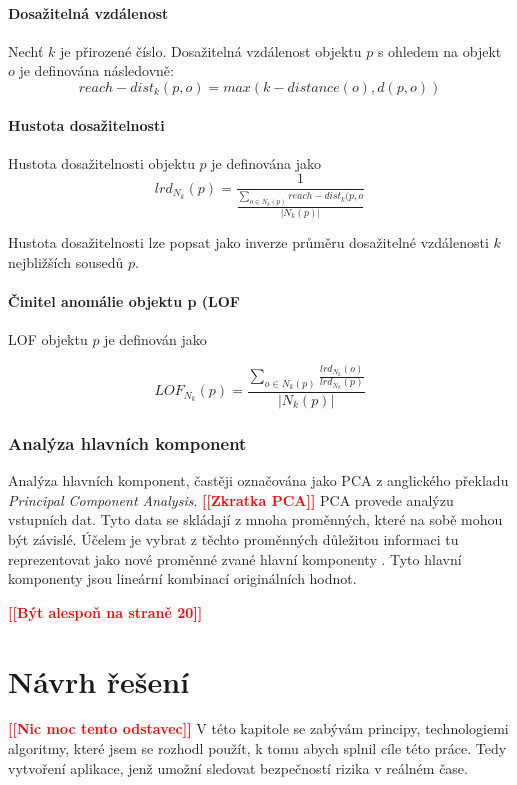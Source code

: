 \documentclass[thesis=M,czech]{FITthesis}[2012/10/20]
\newcommand{\todo}[1]{\textcolor{red}{\textbf{[[#1]]}}}
\begin{document}
			\subsubsection{Dosažitelná vzdálenost}
				Nechť $k$ je přirozené číslo. Dosažitelná vzdálenost objektu $p$ s ohledem na objekt $o$ je definována následovně: 
				$$ reach-dist_k(p, o) = max (k-distance(o), d(p, o)) $$
				
			\subsubsection{Hustota dosažitelnosti}
				Hustota dosažitelnosti objektu $p$ je definována jako
				$$ lrd_{N_k}(p) = \frac{1}{ \frac{\sum_{o \in N_k(p)} reach-dist_k(p,o}{|N_k(p)|}} $$
				
				Hustota dosažitelnosti lze popsat jako inverze průměru dosažitelné vzdálenosti $k$ nejbližších sousedů $p$.
				
			\subsubsection{Činitel anomálie objektu p (LOF}
				LOF objektu $p$ je definován jako 
				
				$$LOF_{N_k}(p) = \frac{\sum_{o \in N_k(p)} \frac{lrd_{N_k}(o)}{lrd_{N_k}(p)}}{|N_k(p)|} $$
			
			
		
		
		\subsection{Analýza hlavních komponent}
		Analýza hlavních komponent, častěji označována jako PCA z anglického překladu \textit{Principal Component Analysis}. \todo{Zkratka PCA} PCA provede analýzu vstupních dat. Tyto data se skládají z mnoha proměnných, které na sobě mohou být závislé. Účelem je vybrat z těchto proměnných důležitou informaci tu reprezentovat jako nové proměnné zvané hlavní komponenty \cite{PCA_book}. Tyto hlavní komponenty jsou lineární kombinací originálních hodnot.
		
		
		
			
	\todo{Být alespoň na straně 20}
	

\chapter{Návrh řešení}
	\todo{Nic moc tento odstavec}
	V této kapitole se zabývám principy, technologiemi algoritmy, které jsem se rozhodl použít, k tomu abych splnil cíle této práce. Tedy vytvoření aplikace, jenž umožní sledovat bezpečností rizika v reálném čase.
	
\end{document}
